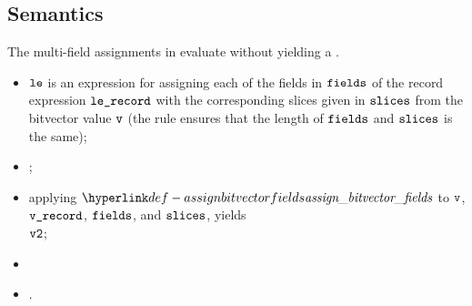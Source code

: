 \FormallyParagraph
\begin{mathpar}
\end{mathpar}

\begin{mathpar}
\end{mathpar}

\subsection{Semantics}
The multi-field assignments in  evaluate without yielding a \dynamicerrorterm.

\ProseParagraph
\AllApply
\begin{itemize}
  \item $\vle$ is an expression for assigning each of the fields in $\fields$
    of the record expression $\vlerecord$ with the corresponding slices given
    in $\vslices$ from the bitvector value $\vv$ %
    (the rule  ensures that the length of $\fields$
    and $\vslices$ is the same);
  \item {}\ProseOrAbnormal;
  \item applying $\assignbitvectorfields$ to $\vv$, $\vrecord$,
    $\fields$, and $\vslices$, yields \\
    $\vvtwo$\ProseOrError;
  \item {}
  \item {}.
\end{itemize}

